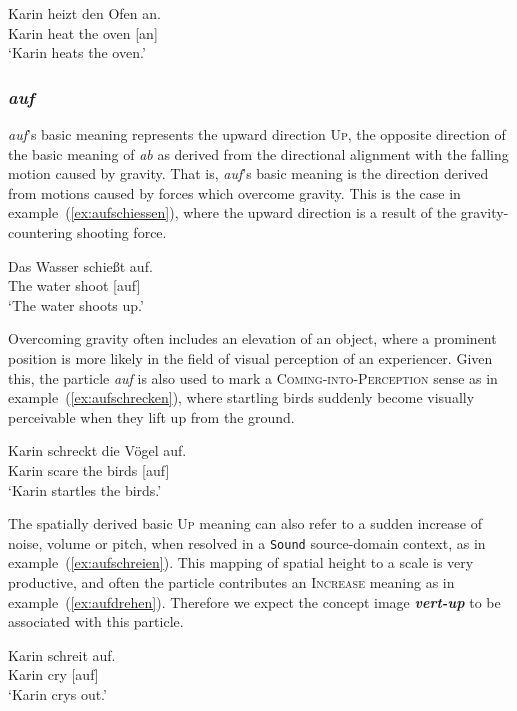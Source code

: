 \documentclass[output=paper]{langsci/langscibook}
\newcommand{\textci}[1]{\textit{\textbf{#1}}}
\begin{document}
\ea\label{ex:anheizen}
\gll Karin heizt den Ofen an.\\
Karin heat the oven [an]\\
\glt `Karin heats the oven.'
\z

\vspace{+1mm}
\subsubsection{\textit{auf}}

\textit{auf}'s basic meaning represents the upward direction
\textsc{Up}, the opposite direction of the basic meaning of
\textit{ab} as derived from the directional alignment with the falling
motion caused by gravity. That is, \textit{auf}'s basic meaning is the
direction derived from motions caused by forces which overcome
gravity. This is the case in example~(\ref{ex:aufschiessen}), where
the upward direction is a result of the gravity-countering shooting
force.

\ea\label{ex:aufschiessen}
\gll Das Wasser schießt auf.\\
The water shoot [auf]\\
\glt `The water shoots up.'
\z

Overcoming gravity often includes an elevation of an object, where a
prominent position is more likely in the field of visual perception of
an experiencer. Given this, the particle \textit{auf} is also used to
mark a \textsc{Coming-into-Perception} sense as in
example~(\ref{ex:aufschrecken}), where startling birds suddenly become
visually perceivable when they lift up from the ground.

\ea\label{ex:aufschrecken}
\gll Karin schreckt die Vögel auf.\\
Karin scare the birds [auf]\\
\glt `Karin startles the birds.'
\z

The spatially derived basic \textsc{Up} meaning can also refer to a
sudden increase of noise, volume or pitch, when resolved in a
\texttt{Sound} source-domain context, as in
example~(\ref{ex:aufschreien}). This mapping of spatial height to a
scale is very productive, and often the particle contributes an
\textsc{Increase} meaning as in
example~(\ref{ex:aufdrehen}). Therefore we expect the concept image
\textci{vert-up} to be associated with this particle.

\ea\label{ex:aufschreien}
\gll Karin schreit auf.\\
Karin cry [auf]\\
\glt `Karin crys out.'
\z
\end{document}
